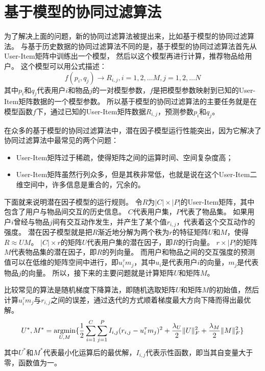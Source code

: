 \section{基于模型的协同过滤算法}
为了解决上面的问题，新的协同过滤算法被提出来，比如基于模型的协同过滤算法。
与基于历史数据的协同过滤算法不同的是，基于模型的协同过滤算法首先从User-Item矩阵中训练出一个模型，
然后以这个模型再进行计算，推荐物品给用户。
这个模型可以用公式描述：
\begin{equation}
f(p_i,q_j)\rightarrow R_{i,j},i=1,2,\dots M, j=1,2,\dots N
\end{equation}
其中$p_i$和$q_j$代表用户$i$和物品$j$的一对模型参数，$f$是把模型参数映射到已知的User-Item矩阵数据的一个模型参数。
所以基于模型的协同过滤算法的主要任务就是在模型函数$f$下，通过已知的User-Item矩阵数据$R_{i,j}$，预测参数$p_i$和$q_j$。

在众多的基于模型的协同过滤算法中，潜在因子模型运行性能突出，因为它解决了协同过滤算法中最常见的两个问题：
\begin{itemize}
\item User-Item矩阵过于稀疏，使得矩阵之间的运算时间、空间复杂度高；
\item User-Item矩阵虽然行列众多，但是其秩非常低，也就是说在这个User-Item二维空间中，许多信息是重合的，冗余的。
\end{itemize}

下面就来说明潜在因子模型的运行规则。
令$R$为$|C|\times|P|$的User-Item矩阵，其中包含了用户与物品间交互的历史信息。
$C$代表用户集，$P$代表了物品集。
如果用户$i$曾经与物品$j$间有交互动作发生，并产生了某个值$r_{i,j}$，代表着这个交互动作的强度。
潜在因子模型就是把$R$渐近地分解为两个秩为$r$的特征矩阵$U$和$M$，使得$R\approx UM$。
$|C|\times r$的矩阵$U$代表用户集的潜在因子，即$R$的行向量。
$r\times |P|$的矩阵$M$代表物品集的潜在因子，即$R$的列向量。
而用户和物品之间的交互强度的预测值可以在低维的矩阵空间中进行，即$u_i^\tau m_j$，其中$u_i$是代表用户$i$的向量，$m_j$是代表物品$j$的向量。
所以，接下来的主要问题就是计算矩阵$U$和矩阵$M$。

比较常见的算法是随机梯度下降算法，即随机选取矩阵$U$和矩阵$M$的初始值，然后计算$u_i^\tau m_j$与$r_{i,j}$之间的误差，通过迭代的方式顺着梯度最大方向下降而得出最优解。
\begin{equation}
U^*,M^* = \mathop{\operatorname*{argmin}}_{U,M} \{\frac{1}{2} \sum_{i=1}^C \sum_{j=1}^P I_{i,j}(r_{i,j}-u_i^{\tau} m_j)^2 + \frac{\lambda_U}{2}\lVert U\rVert_F^2 +\frac{\lambda_M}{2}\lVert M\rVert_F^2\}
\end{equation}
其中$U^*$和$M^*$代表最小化运算后的最优解，$I_{i,j}$代表示性函数，即当其自变量大于零，函数值为一。

